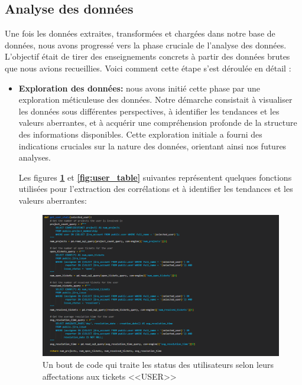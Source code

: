         \subsection{Analyse des données}
        \par Une fois les données extraites, transformées et chargées dans notre base de données, nous avons progressé vers la phase cruciale de l'analyse des données. L'objectif était de tirer des enseignements concrets à partir des données brutes que nous avions recueillies. Voici comment cette étape s'est déroulée en détail :
        \begin{itemize}
            \item \textbf{Exploration des données:} nous avons initié cette phase par une exploration méticuleuse des données. Notre démarche consistait à visualiser les données sous différentes perspectives, à identifier les tendances et les valeurs aberrantes, et à acquérir une compréhension profonde de la structure des informations disponibles. Cette exploration initiale a fourni des indications cruciales sur la nature des données, orientant ainsi nos futures analyses.
            \par Les figures \textbf{\ref{fig:user_status}} et \textbf{\ref{fig:user_table}} suivantes représentent quelques fonctions utilisées pour l'extraction des corrélations et à identifier les tendances et les valeurs aberrantes:
            \begin{figure}[H]
                \centering
                \includegraphics[width=1\linewidth]{img//captures/user_status.png}
                \caption{Un bout de code qui traite les status des utilisateurs selon leurs affectations aux tickets  <<USER>>}
                \label{fig:user_status}
            \end{figure}

\end{itemize}
